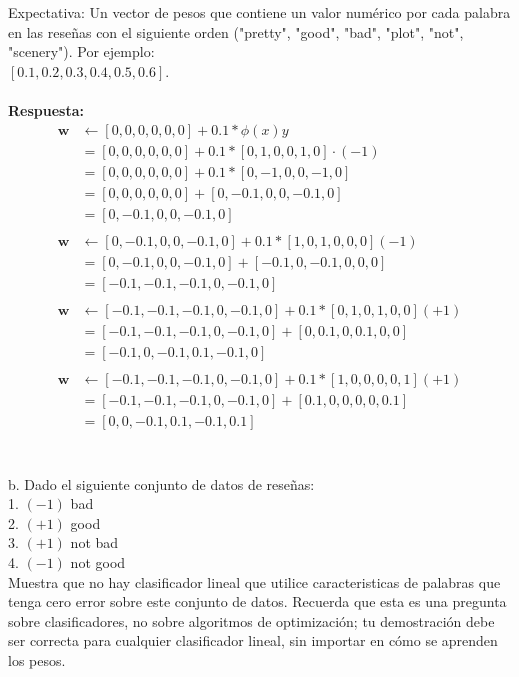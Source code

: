 \documentclass{article}
\begin{document}
Expectativa: Un vector de pesos que contiene un valor numérico por cada palabra en las reseñas con el siguiente orden ("pretty", "good", "bad", "plot", "not", "scenery"). Por ejemplo: \\$[0.1,0.2,0.3,0.4,0.5,0.6]$.\\

\\\textbf{Respuesta:}\\

\begin{align*}
\boldsymbol{w} &\leftarrow [0,0,0,0,0,0] +0.1 * \phi(x) y \\
&=  [0,0,0,0,0,0] +0.1 * [0,1,0,0,1,0]\cdot(-1) \\
&=  [0,0,0,0,0,0] +0.1 * [0,-1,0,0,-1,0]\\
&=  [0,0,0,0,0,0] + [0,-0.1,0,0,-0.1,0]\\
&=  [0,-0.1,0,0,-0.1,0]\\\\
\boldsymbol{w} &\leftarrow [0,-0.1,0,0,-0.1,0] +0.1 * [1,0,1,0,0,0](-1) \\
&=  [0,-0.1,0,0,-0.1,0] +[-0.1,0,-0.1,0,0,0]\\
&=  [-0.1,-0.1,-0.1,0,-0.1,0]\\\\
\boldsymbol{w} &\leftarrow [-0.1,-0.1,-0.1,0,-0.1,0] +0.1 * [0,1,0,1,0,0](+1) \\
&=  [-0.1,-0.1,-0.1,0,-0.1,0] +[0,0.1,0,0.1,0,0]\\
&=  [-0.1,0,-0.1,0.1,-0.1,0]\\\\
\boldsymbol{w} &\leftarrow [-0.1,-0.1,-0.1,0,-0.1,0] +0.1 * [1,0,0,0,0,1](+1) \\
&=  [-0.1,-0.1,-0.1,0,-0.1,0] +[0.1,0,0,0,0,0.1]\\
&=  [0,0,-0.1,0.1,-0.1,0.1]\\\\
\end{align*}

\subsection{}
b. Dado el siguiente conjunto de datos de reseñas:\\
1. $(-1)$ bad\\
2. $(+1)$ good\\
3. $(+1)$ not bad\\
4. $(-1)$ not good\\
Muestra que no hay clasificador lineal que utilice caracteristicas de palabras que tenga cero error sobre este conjunto de datos. Recuerda que esta es una pregunta sobre clasificadores, no sobre algoritmos de optimización; tu demostración debe ser correcta para cualquier clasificador lineal, sin importar en cómo se aprenden los pesos.\\
\end{document}
